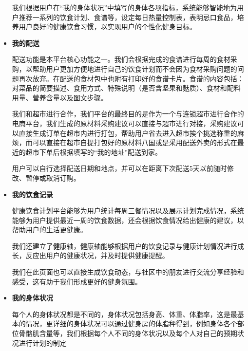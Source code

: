 \documentclass[UTF8,12pt]{ctexart}
\numberwithin{figure}{section}%
\begin{document}
\begin{spacing}{2}
\begin{itemize}
	我们根据用户在“我的身体状况”中填写的身体各项指标，系统能够智能地为用户推荐一系列的饮食计划、食谱等，设定每日热量控制表，表明忌口食品，培养用户良好的健康饮食习惯，以实现用户的个性化健身目标。	
	
	\item\textbf{我的配送}
	
	配送功能是本平台核心功能之一。我们会根据完成的食谱进行每周的食材采购，以帮助用户更加方便地进行自己的饮食计划而不会因为食材采购问题的问题再次放弃。在配送的食材包中也附有打印好的食谱卡片。食谱的内容包括：对菜品的简要描述、食用方式、特殊说明（是否含坚果和麸质）、食材和配料用量、营养含量以及图文步骤。
	
	我们和超市进行合作，我们平台的最终目的是作为一个与连锁超市进行合作的电商平台，我们生成的原材料采购建议可以直接与超市进行对接，采购建议可以直接生成订单在超市内进行打包，帮助用户省去进入超市挨个挑选称重的麻烦，而可以直接在超市自提打包好的原材料八国或是采用配送外卖的形式在最近的超市下单后根据填写的“我的地址”配送到家。
	
	用户可以自行选择配送日期和地点，并可以在距离下次配送5天以前随时修改、暂停或取消订购。
	
	
	
	\item\textbf{我的饮食记录}		
	
	健康饮食计划平台能够为用户统计每周三餐情况以及展示计划完成情况，系统能够为用户提供最近一周的饮食数据，还会根据饮食情况给出健康的建议，以帮助用户的生活更健康。
	
	我们还建立了健康轴，健康轴能够根据用户的饮食记录与健康计划情况进行成长，反应出用户的健康状况，并及时提供健康提醒。
	
	我们在此页面也可以直接生成饮食动态，与社区中的朋友进行交流分享经验和感受，这有助于我们形成更好的健身氛围。
	
	
	\item\textbf{我的身体状况}	
	
	每个人的身体状况都是不同的，身体状况包括身高、体重、体脂率，这是最基本的情况，更详细的身体状况可以通过健身房的体脂秤得到，例如身体各个部位骨骼肌含量等，我们根据每个人不同的身体状况以及每个人对自己的预期状况进行计划的制定
	

\end{itemize}
\end{spacing}
\end{document}
